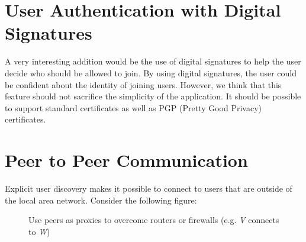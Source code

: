 \section{User Authentication with Digital Signatures}
A very interesting addition would be the use of digital signatures to help
the user decide who should be allowed to join. By using digital
signatures, the user could be confident about the identity of joining users.
However, we think that this feature should not sacrifice the simplicity
of the application. It should be possible to support standard certificates
as well as PGP (Pretty Good Privacy) certificates.


\section{Peer to Peer Communication}
Explicit user discovery makes it possible to connect to users that are outside 
of the local area network. Consider the following figure:

\begin{figure}[H]
 \centering
 \caption{Use peers as proxies to overcome routers or firewalls (e.g. \emph{V} connects to \emph{W})}
 \label{fig:outlook.peertopeer}
\end{figure}

